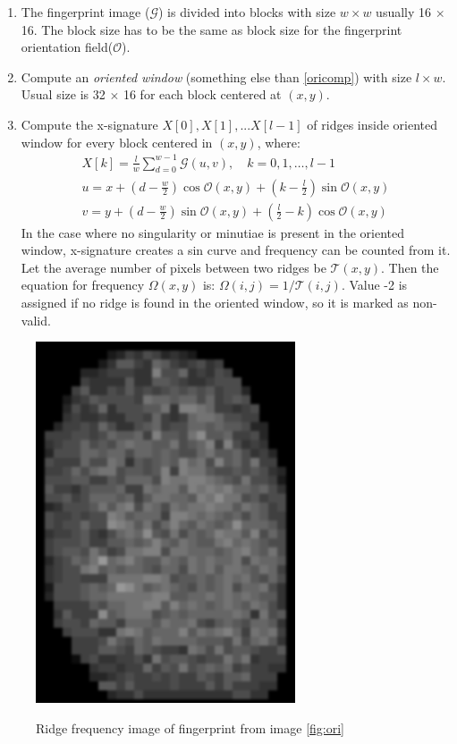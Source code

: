 \begin{enumerate}
    \item The fingerprint image ($\mathcal{G}$) is divided into blocks with size $w \times w$ usually 16 $\times$ 16. The block size has to be the same as block size for the fingerprint orientation field($\mathcal{O}$). \cite{hong1998fingerprint}
    
    \item Compute an \emph{oriented window} (something else than \ref{oricomp}) with size $l \times w$. Usual size is 32 $\times$ 16 for each block centered at $(x, y)$. \cite{hong1998fingerprint}
    
    \item Compute the x-signature $X[0], X[1], ... X[l-1]$ of ridges inside oriented window for every block centered in $(x, y)$, where:
    \begin{align}
    X[k]=\frac{l}{w} \sum_{d=0}^{w-1} \mathcal{G}(u, v), \quad k=0,1, \ldots, l-1 \\
    u=x+\left(d-\frac{w}{2}\right) \cos \mathcal{O}(x, y)+\left(k-\frac{l}{2}\right) \sin \mathcal{O}(x, y)\\
    v=y+\left(d-\frac{w}{2}\right) \sin \mathcal{O}(x, y)+\left(\frac{l}{2}-k\right) \cos \mathcal{O}(x, y)
    \end{align}
	In the case where no singularity or minutiae is present in the oriented window, x-signature creates a sin curve and frequency can be counted from it. Let the average number of pixels between two ridges be $\mathcal{T}(x, y)$. Then the equation for frequency $\Omega(x, y)$ is: $\Omega(i, j)=1 / \mathcal{T}(i, j)$. Value -2 is assigned if no ridge is found in the oriented window, so it is marked as non-valid. \cite{hong1998fingerprint}
	
\end{enumerate}
\begin{figure}[H]
    \centering
        {\includegraphics[width=0.3\linewidth]{obrazky-figures/freq_navrh.png}}\\
        \caption{Ridge frequency image of fingerprint from image \ref{fig:ori}}
        \label{fig:freq_img}
\end{figure}

